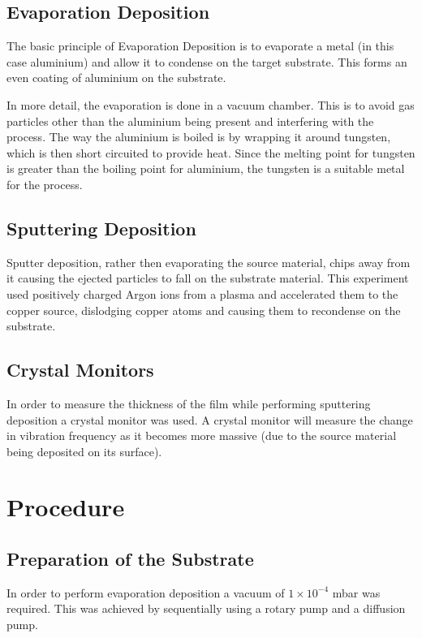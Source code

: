 \documentclass[aps,prl,twocolumn,groupedaddress,showkeys]{revtex4}
\begin{document}
\subsection{Evaporation Deposition}

The basic principle of Evaporation Deposition is to evaporate a metal (in this case aluminium) and allow it to condense on the target substrate. This forms an even coating of aluminium on the substrate. 

In more detail, the evaporation is done in a vacuum chamber. This is to avoid gas particles other than the aluminium being present and interfering with the process. The way the aluminium is boiled is by wrapping it around tungsten, which is then short circuited to provide heat. Since the melting point for tungsten is greater than the boiling point for aluminium, the tungsten is a suitable metal for the process.

\subsection{Sputtering Deposition}

Sputter deposition, rather then evaporating the source material, chips away from it causing the ejected particles to fall on the substrate material. This experiment used positively charged Argon ions from a plasma and accelerated them to the copper source, dislodging copper atoms and causing them to recondense on the substrate.


\subsection{Crystal Monitors}

In order to measure the thickness of the film while performing sputtering deposition a crystal monitor was used. A crystal monitor will measure the change in vibration frequency as it becomes more massive (due to the source material being deposited on its surface).


\section{Procedure}

\subsection{Preparation of the Substrate}

In order to perform evaporation deposition a vacuum of $1\times10^{-4}$ mbar was required. This was achieved by sequentially using a rotary pump and a diffusion pump.
\end{document}
